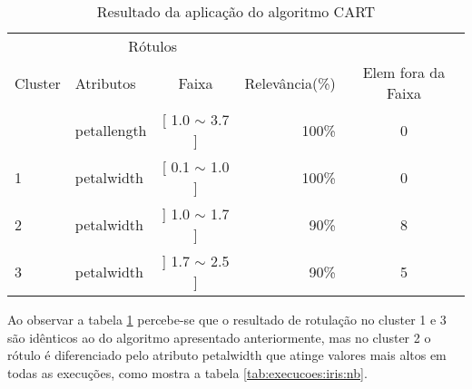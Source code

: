 \begin{table}[!h]
\centering
\caption{Resultado da aplicação do algoritmo CART}
\label{tab:rot:iris:cart}
\begin{tabular}{llcrc} \hline
 
\multicolumn{1}{c}{\cellcolor[HTML]{FFFFFF}} & \multicolumn{2}{c}{Rótulos}                & \multicolumn{1}{r}{}               & \\ \cline{2-3}
Cluster                                      & Atributos      & \multicolumn{1}{c}{Faixa} & \multicolumn{1}{c}{Relevância(\%)} & Elem fora da Faixa\\ \hline \hline
                                             & petallength    & [ 1.0 $\sim$  3.7 ]       & 100\%                               & 0 \\  
\multirow{-2}{*}{1}                          & petalwidth     & [ 0.1 $\sim$  1.0 ]       & 100\%                               & 0 \\  \hline
2                                            & petalwidth     & ] 1.0 $\sim$  1.7 ]       & 90\%                               & 8\\  \hline
3                                            & petalwidth     & ] 1.7 $\sim$  2.5 ]       & 90\%                               & 5\\ \hline \hline
\end{tabular}
\end{table}

Ao observar a tabela \ref{tab:rot:iris:cart} percebe-se que o resultado de rotulação no cluster 1 e 3 são idênticos ao do algoritmo apresentado anteriormente, mas  no cluster 2 o rótulo é diferenciado pelo atributo petalwidth que atinge valores mais altos em todas as execuções, como mostra a tabela \ref{tab:execucoes:iris:nb}.



